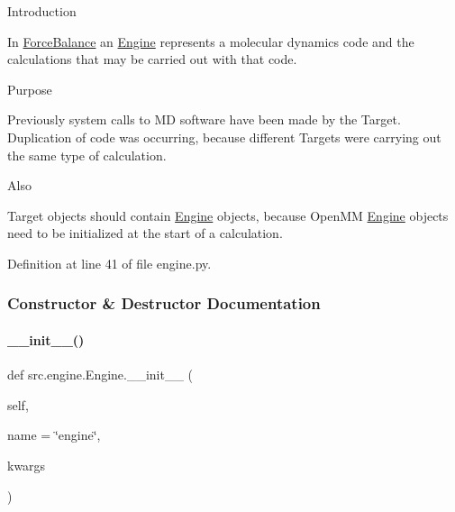 \begin{DoxyEnumerate}
\item Introduction
\end{DoxyEnumerate}

In \hyperlink{namespaceForceBalance}{Force\+Balance} an \hyperlink{classsrc_1_1engine_1_1Engine}{Engine} represents a molecular dynamics code and the calculations that may be carried out with that code.


\begin{DoxyEnumerate}
\item Purpose
\end{DoxyEnumerate}

Previously system calls to MD software have been made by the Target. Duplication of code was occurring, because different Targets were carrying out the same type of calculation.


\begin{DoxyEnumerate}
\item Also
\end{DoxyEnumerate}

Target objects should contain \hyperlink{classsrc_1_1engine_1_1Engine}{Engine} objects, because Open\+MM \hyperlink{classsrc_1_1engine_1_1Engine}{Engine} objects need to be initialized at the start of a calculation. 

Definition at line 41 of file engine.\+py.



\subsubsection{Constructor \& Destructor Documentation}
\mbox{\label{classsrc_1_1engine_1_1Engine_a11d96735ebad9424597ce5bcc136ecf4}} 
\paragraph{\texorpdfstring{\+\_\+\+\_\+init\+\_\+\+\_\+()}{\_\_init\_\_()}}
{\footnotesize\ttfamily def src.\+engine.\+Engine.\+\_\+\+\_\+init\+\_\+\+\_\+ (\begin{DoxyParamCaption}\item[{}]{self,  }\item[{}]{name = {\ttfamily \char`\"{}engine\char`\"{}},  }\item[{}]{kwargs }\end{DoxyParamCaption})}



